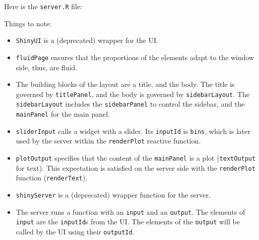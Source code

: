 \documentclass[]{book}
\newenvironment{Shaded}{\begin{snugshade}}{\end{snugshade}}
\newcommand{\KeywordTok}[1]{\textcolor[rgb]{0.13,0.29,0.53}{\textbf{#1}}}
\newcommand{\DataTypeTok}[1]{\textcolor[rgb]{0.13,0.29,0.53}{#1}}
\newcommand{\DecValTok}[1]{\textcolor[rgb]{0.00,0.00,0.81}{#1}}
\newcommand{\StringTok}[1]{\textcolor[rgb]{0.31,0.60,0.02}{#1}}
\newcommand{\CommentTok}[1]{\textcolor[rgb]{0.56,0.35,0.01}{\textit{#1}}}
\newcommand{\ControlFlowTok}[1]{\textcolor[rgb]{0.13,0.29,0.53}{\textbf{#1}}}
\newcommand{\OperatorTok}[1]{\textcolor[rgb]{0.81,0.36,0.00}{\textbf{#1}}}
\newcommand{\NormalTok}[1]{#1}
\providecommand{\tightlist}{%
  \setlength{\itemsep}{0pt}\setlength{\parskip}{0pt}}
\theoremstyle{definition}
\theoremstyle{definition}
\theoremstyle{definition}
\theoremstyle{remark}
\begin{document}
Here is the \texttt{server.R} file:

\begin{Shaded}
\end{Shaded}

Things to note:

\begin{itemize}
\tightlist
\item
  \texttt{ShinyUI} is a (deprecated) wrapper for the UI.
\item
  \texttt{fluidPage} ensures that the proportions of the elements adapt
  to the window side, thus, are fluid.
\item
  The building blocks of the layout are a title, and the body. The title
  is governed by \texttt{titlePanel}, and the body is governed by
  \texttt{sidebarLayout}. The \texttt{sidebarLayout} includes the
  \texttt{sidebarPanel} to control the sidebar, and the
  \texttt{mainPanel} for the main panel.
\item
  \texttt{sliderInput} calls a widget with a slider. Its
  \texttt{inputId} is \texttt{bins}, which is later used by the server
  within the \texttt{renderPlot} reactive function.
\item
  \texttt{plotOutput} specifies that the content of the
  \texttt{mainPanel} is a plot (\texttt{textOutput} for text). This
  expectation is satisfied on the server side with the
  \texttt{renderPlot} function (\texttt{renderText}).
\item
  \texttt{shinyServer} is a (deprecated) wrapper function for the
  server.
\item
  The server runs a function with an \texttt{input} and an
  \texttt{output}. The elements of \texttt{input} are the
  \texttt{inputId}s from the UI. The elements of the \texttt{output}
  will be called by the UI using their \texttt{outputId}.
\end{itemize}
\end{document}
